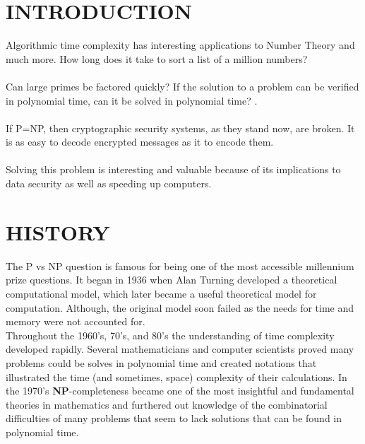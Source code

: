 \documentclass[landscape]{sciposter}
\begin{document}
\begin{multicols}{4}

\section*{INTRODUCTION}

Algorithmic time complexity has interesting applications to Number Theory and much more.  How long does it take to sort a list of a million numbers?  
\\
\\
Can  large primes be factored quickly?  If the solution to a problem can be verified in polynomial time, can it be solved in polynomial time?  \cite{CD}.
\\
\\
If P=NP, then cryptographic security systems, as they stand now, are broken.  It is as easy to decode encrypted messages as it to encode them.
\\
\\
Solving this problem is interesting and valuable because of its implications to data security as well as speeding up computers.
\section{HISTORY}
The P vs NP question is famous for being one of the most accessible millennium prize questions\cite{Sipser}. It began in 1936 when Alan Turning developed a theoretical computational model, which later became a useful theoretical model for computation. Although, the original model soon failed as the needs for time and memory were not accounted for\cite{Fortnow}.
\\
Throughout the 1960's, 70's, and 80's the understanding of time complexity developed rapidly. Several mathematicians and computer scientists proved many problems could be solves in polynomial time and created notations that illustrated the time (and sometimes, space) complexity of their calculations. In the 1970's \textbf{NP}-completeness became one of the most insightful and fundamental theories in mathematics and furthered out knowledge of the combinatorial difficulties of many problems that seem to lack solutions that can be found in polynomial time\cite{Fortnow}.


\end{multicols}
\end{document}

